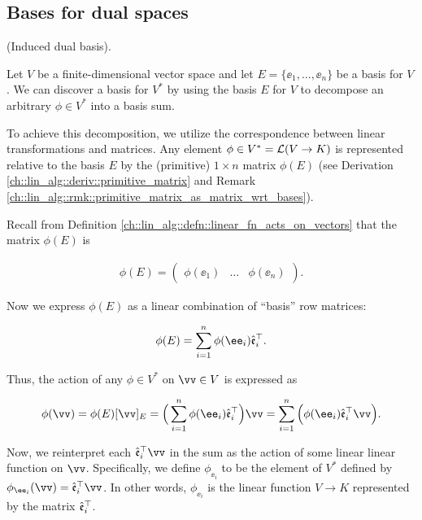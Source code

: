 \subsection*{Bases for dual spaces}

\begin{deriv}
\label{ch::motivated_intro::deriv::induced_dual_basis}
    (Induced dual basis).
    
    Let $V$ be a finite-dimensional vector space and let $E = \{\ee_1, ..., \ee_n\}$ be a basis for $V$. We can discover a basis for $V^*$ by using the basis $E$ for $V$ to decompose an arbitrary $\phi \in V^*$ into a basis sum. 
    
    To achieve this decomposition, we utilize the correspondence between linear transformations and matrices. Any element $\phi \in V^* = \mathcal{L}(V \rightarrow K)$ is represented relative to the basis $E$ by the (primitive) $1 \times n$ matrix $\phi(E)$ (see Derivation \ref{ch::lin_alg::deriv::primitive_matrix} and Remark \ref{ch::lin_alg::rmk::primitive_matrix_as_matrix_wrt_bases}).
    
    Recall from Definition \ref{ch::lin_alg::defn::linear_fn_acts_on_vectors} that the matrix $\phi(E)$ is
    
    \begin{align*}
        \phi(E)
        =
        \begin{pmatrix} 
            \phi(\ee_1) & \hdots & \phi(\ee_n)
        \end{pmatrix}.
    \end{align*}
    
    Now we express $\phi(E)$ as a linear combination of ``basis'' row matrices:
    
    \begin{align*}
        \phi(E) = \sum_{i = 1}^n \phi(\ee_i) \see_i^\top.
    \end{align*}
    
    Thus, the action of any $\phi \in V^*$ on $\vv \in V$ is expressed as

    \begin{align*}
        \phi(\vv) = \phi(E) [\vv]_E 
        = \Big( \sum_{i = 1}^n \phi(\ee_i) \see_i^\top \Big) \vv 
        = \sum_{i = 1}^n \Big( \phi(\ee_i) \see_i^\top \vv \Big).
    \end{align*}
    
    Now, we reinterpret each $\see_i^\top \vv$ in the sum as the action of some linear linear function on $\vv$. Specifically, we define $\phi_{\ee_i}$ to be the element of $V^*$ defined by $\phi_{\ee_i}(\vv) = \see_i^\top \vv$. In other words, $\phi_{\ee_i}$ is the linear function $V \rightarrow K$ represented by the matrix $\hat{\mathfrak{e}}_i^\top$.
    

\end{deriv}
